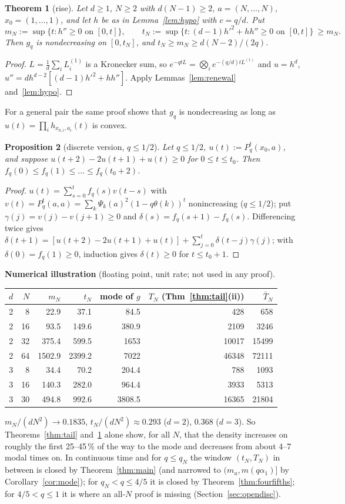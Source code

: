 \documentclass[11pt,a4paper]{article}
\newtheorem{theorem}{Theorem}[section]
\newtheorem{proposition}[theorem]{Proposition}
\theoremstyle{definition}
\begin{document}
\begin{theorem}[rise]\label{thm:rise}
Let $d\ge1$, $N\ge2$ with $d(N-1)\ge2$, $a=(N,\dots,N)$, $x_0=(1,\dots,1)$, and let $h$ be as in Lemma~\ref{lem:hypo} with $c=q/d$. Put
\[
m_N:=\sup\{t:h''\ge0\text{ on }[0,t]\},\qquad t_N:=\sup\{t:(d-1)h'^2+hh''\ge0\text{ on }[0,t]\}\ \ge m_N .
\]
Then $g_q$ is nondecreasing on $[0,t_N]$, and $t_N\ge m_N\ge d(N-2)/(2q)$.
\end{theorem}
\begin{proof}
$L=\frac1d\sum_iL^{(1)}_i$ is a Kronecker sum, so $e^{-qtL}=\bigotimes_ie^{-(q/d)tL^{(1)}}$ and $u=h^d$, $u''=dh^{d-2}[(d-1)h'^2+hh'']$. Apply Lemmas~\ref{lem:renewal} and~\ref{lem:hypo}.
\end{proof}
For a general pair the same proof shows that $g_q$ is nondecreasing as long as $u(t)=\prod_ih_{x_{0,i},a_i}(t)$ is convex.

\begin{proposition}[discrete version, $q\le1/2$]\label{prop:risedisc}
Let $q\le1/2$, $u(t):=P_q^t(x_0,a)$, and suppose $u(t+2)-2u(t+1)+u(t)\ge0$ for $0\le t\le t_0$. Then $f_q(0)\le f_q(1)\le\dots\le f_q(t_0+2)$.
\end{proposition}
\begin{proof}
$u(t)=\sum_{s=0}^tf_q(s)v(t-s)$ with $v(t)=P_q^t(a,a)=\sum_k\Psi_k(a)^2(1-q\theta(k))^t$ nonincreasing ($q\le1/2$); put $\gamma(j)=v(j)-v(j+1)\ge0$ and $\delta(s)=f_q(s+1)-f_q(s)$. Differencing twice gives $\delta(t+1)=[u(t+2)-2u(t+1)+u(t)]+\sum_{j=0}^t\delta(t-j)\gamma(j)$; with $\delta(0)=f_q(1)\ge0$, induction gives $\delta(t)\ge0$ for $t\le t_0+1$.
\end{proof}

\noindent\textbf{Numerical illustration} (floating point, unit rate; not used in any proof).
\begin{center}
\begin{tabular}{rrrrrrr}
\toprule
$d$&$N$&$m_N$&$t_N$&mode of $g$&$T_N$ (Thm~\ref{thm:tail}(ii))&$\bar T_N$\\\midrule
2&8&22.9&37.1&84.5&428&658\\
2&16&93.5&149.6&380.9&2109&3246\\
2&32&375.4&599.5&1653&10017&15499\\
2&64&1502.9&2399.2&7022&46348&72111\\
3&8&34.4&70.2&204.4&788&1093\\
3&16&140.3&282.0&964.4&3933&5313\\
3&30&494.8&992.6&3808.5&16365&21804\\\bottomrule
\end{tabular}
\end{center}
$m_N/(dN^2)\to0.1835$, $t_N/(dN^2)\approx0.293$ ($d=2$), $0.368$ ($d=3$). So Theorems~\ref{thm:tail} and~\ref{thm:rise} alone show, for all $N$, that the density increases on roughly the first 25--45\,\% of the way to the mode and decreases from about 4--7 modal times on. In continuous time and for $q\le q_N$ the window $(t_N,T_N)$ in between is closed by Theorem~\ref{thm:main} (and narrowed to $(m_u,m(q\alpha_1)]$ by Corollary~\ref{cor:mode}); for $q_N<q\le4/5$ it is closed by Theorem~\ref{thm:fourfifths}; for $4/5<q\le1$ it is where an all-$N$ proof is missing (Section~\ref{sec:opendisc}).
\end{document}
